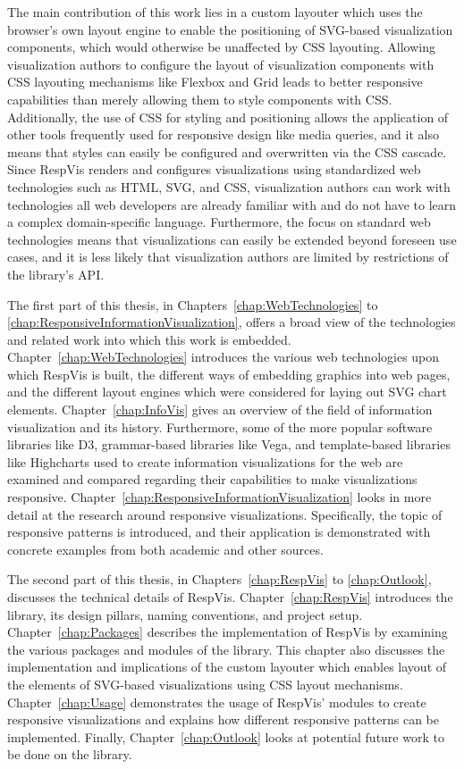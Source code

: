 The main contribution of this work lies in a custom layouter which
uses the browser's own layout engine to enable the positioning of
SVG-based visualization components, which would otherwise be
unaffected by CSS layouting. Allowing visualization authors to
configure the layout of visualization components with CSS layouting
mechanisms like Flexbox and Grid leads to better responsive
capabilities than merely allowing them to style components with CSS.
Additionally, the use of CSS for styling and positioning allows the
application of other tools frequently used for responsive design like
media queries, and it also means that styles can easily be configured
and overwritten via the CSS cascade. Since RespVis renders and
configures visualizations using standardized web technologies such as
HTML, SVG, and CSS, visualization authors can work with technologies
all web developers are already familiar with and do not have to learn
a complex domain-specific language. Furthermore, the focus on standard
web technologies means that visualizations can easily be extended
beyond foreseen use cases, and it is less likely that visualization
authors are limited by restrictions of the library's API.



The first part of this thesis, in Chapters~\ref{chap:WebTechnologies}
to \ref{chap:ResponsiveInformationVisualization}, offers a broad view
of the technologies and related work into which this work is
embedded. Chapter~\ref{chap:WebTechnologies} introduces the various
web technologies upon which RespVis is built, the different ways of
embedding graphics into web pages, and the different layout engines
which were considered for laying out SVG chart elements.
Chapter~\ref{chap:InfoVis} gives an overview of the field of
information visualization and its history. Furthermore, some of the
more popular software libraries like D3, grammar-based libraries like
Vega, and template-based libraries like Highcharts used to create
information visualizations for the web are examined and compared
regarding their capabilities to make visualizations responsive.
Chapter~\ref{chap:ResponsiveInformationVisualization} looks in more
detail at the research around responsive visualizations.
Specifically, the topic of responsive patterns is introduced, and
their application is demonstrated with concrete examples from both
academic and other sources.

The second part of this thesis, in Chapters~\ref{chap:RespVis} to
\ref{chap:Outlook}, discusses the technical details of RespVis.
Chapter~\ref{chap:RespVis} introduces the library, its design pillars,
naming conventions, and project setup. Chapter~\ref{chap:Packages}
describes the implementation of RespVis by examining the various
packages and modules of the library. This chapter also discusses the
implementation and implications of the custom layouter which enables
layout of the elements of SVG-based visualizations using CSS layout
mechanisms. Chapter~\ref{chap:Usage} demonstrates the usage of
RespVis' modules to create responsive visualizations and explains how
different responsive patterns can be implemented. Finally,
Chapter~\ref{chap:Outlook} looks at potential future work to be done
on the library.

